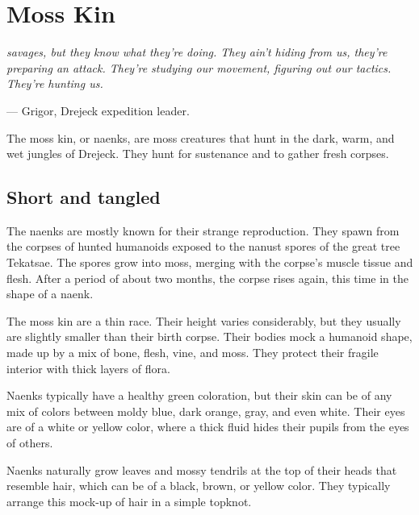 \section{Moss Kin} \label{sec::mosskin}

\textit{savages, but they know what they're doing.
They ain't hiding from us, they're preparing an attack.
They're studying our movement, figuring out our tactics.
They're hunting us.}

\hspace*{\fill} --- Grigor, Drejeck expedition leader.

The moss kin, or naenks, are moss creatures that hunt in the dark, warm, and wet jungles of Drejeck.
They hunt for sustenance and to gather fresh corpses.

\subsection*{Short and tangled}
The naenks are mostly known for their strange reproduction.
They spawn from the corpses of hunted humanoids exposed to the nanust spores of the great tree Tekatsae.
The spores grow into moss, merging with the corpse's muscle tissue and flesh.
After a period of about two months, the corpse rises again, this time in the shape of a naenk.

The moss kin are a thin race.
Their height varies considerably, but they usually are slightly smaller than their birth corpse.
Their bodies mock a humanoid shape, made up by a mix of bone, flesh, vine, and moss.
They protect their fragile interior with thick layers of flora.

Naenks typically have a healthy green coloration, but their skin can be of any mix of colors between moldy blue, dark orange, gray, and even white.
Their eyes are of a white or yellow color, where a thick fluid hides their pupils from the eyes of others.

Naenks naturally grow leaves and mossy tendrils at the top of their heads that resemble hair, which can be of a black, brown, or yellow color.
They typically arrange this mock-up of hair in a simple topknot.


